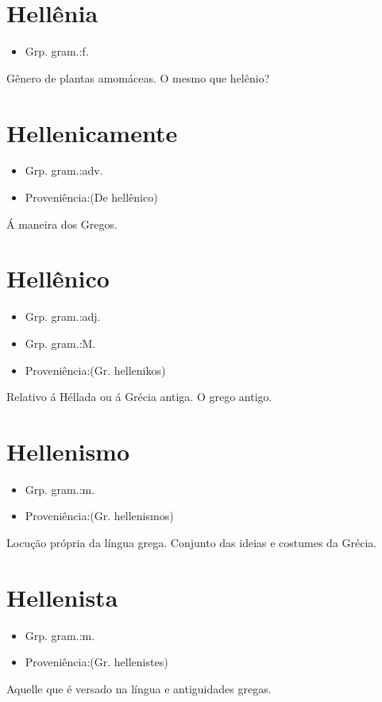 \documentclass{article}
\begin{document}
\section{Hellênia}
\begin{itemize}
\item {Grp. gram.:f.}
\end{itemize}
Gênero de plantas amomáceas.
O mesmo que \textunderscore helênio\textunderscore ?
\section{Hellenicamente}
\begin{itemize}
\item {Grp. gram.:adv.}
\end{itemize}
\begin{itemize}
\item {Proveniência:(De \textunderscore hellênico\textunderscore )}
\end{itemize}
Á maneira dos Gregos.
\section{Hellênico}
\begin{itemize}
\item {Grp. gram.:adj.}
\end{itemize}
\begin{itemize}
\item {Grp. gram.:M.}
\end{itemize}
\begin{itemize}
\item {Proveniência:(Gr. \textunderscore hellenikos\textunderscore )}
\end{itemize}
Relativo á Héllada ou á Grécia antiga.
O grego antigo.
\section{Hellenismo}
\begin{itemize}
\item {Grp. gram.:m.}
\end{itemize}
\begin{itemize}
\item {Proveniência:(Gr. \textunderscore hellenismos\textunderscore )}
\end{itemize}
Locução própria da língua grega.
Conjunto das ideias e costumes da Grécia.
\section{Hellenista}
\begin{itemize}
\item {Grp. gram.:m.}
\end{itemize}
\begin{itemize}
\item {Proveniência:(Gr. \textunderscore hellenistes\textunderscore )}
\end{itemize}
Aquelle que é versado na língua e antiguidades gregas.
\end{document}
